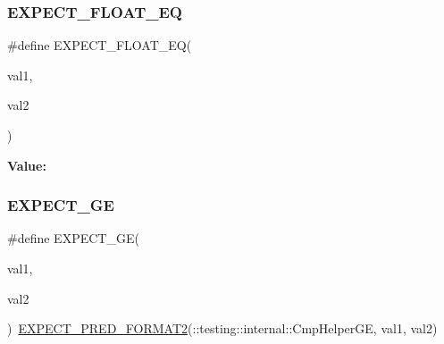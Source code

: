\subsubsection{\texorpdfstring{EXPECT\_FLOAT\_EQ}{EXPECT\_FLOAT\_EQ}}
{\footnotesize\ttfamily \#define E\+X\+P\+E\+C\+T\+\_\+\+F\+L\+O\+A\+T\+\_\+\+EQ(\begin{DoxyParamCaption}\item[{}]{val1,  }\item[{}]{val2 }\end{DoxyParamCaption})}

{\bfseries Value\+:}
\begin{DoxyCode}{0}

\end{DoxyCode}
\mbox{\label{_obj__test_2lib_2googletest-release-1_88_81_2googletest_2include_2gtest_2gtest_8h_ab7a0ff4bfa4d9b27baa118d8b0756ca0}} 
\subsubsection{\texorpdfstring{EXPECT\_GE}{EXPECT\_GE}}
{\footnotesize\ttfamily \#define E\+X\+P\+E\+C\+T\+\_\+\+GE(\begin{DoxyParamCaption}\item[{}]{val1,  }\item[{}]{val2 }\end{DoxyParamCaption})~\mbox{\hyperlink{_obj__test_2lib_2googletest-release-1_88_81_2googletest_2include_2gtest_2gtest__pred__impl_8h_af0141918615a5e2d5247e9cda8324dae}{E\+X\+P\+E\+C\+T\+\_\+\+P\+R\+E\+D\+\_\+\+F\+O\+R\+M\+A\+T2}}(\+::testing\+::internal\+::\+Cmp\+Helper\+GE, val1, val2)}

\mbox{\label{_obj__test_2lib_2googletest-release-1_88_81_2googletest_2include_2gtest_2gtest_8h_aa8bc8320813e1abb0016129b636e3b27}} 
